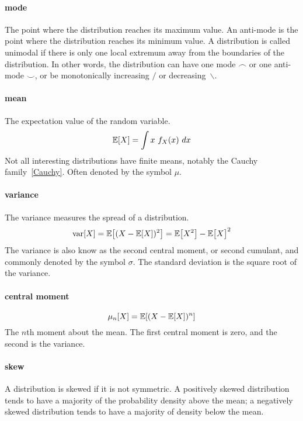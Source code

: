 \paragraph*{mode}
The point where the distribution reaches its maximum value. An anti-mode is the point where the distribution reaches its minimum value. 
A distribution is called unimodal if there is only one local extremum away from the boundaries of the distribution. In other words, the distribution can have one mode $\frown$ or one anti-mode $\smile$, or be monotonically increasing $/$ or decreasing~$\backslash$.




\paragraph*{mean} The expectation value of the random variable. 
\[
\operatorname{\mathbb E}[X] = \int x\ f_X(x)\ dx 
\notag
\]
Not all interesting distributions have finite means, notably the Cauchy family~\eqref{Cauchy}. Often denoted by the symbol $\mu$.


\paragraph*{variance} The variance measures the spread of a distribution.
\[
\op{var}[X] =  
 \expect\Left[ (X-\expect[X])^2\Right]     = \expect\bigl[X^2\bigr] - \expect\bigl[X\bigr]^2
\notag \checked
\]
The variance is also know as the second central moment, or second cumulant, and commonly denoted by the symbol $\sigma$. The standard deviation is the square root of the variance.


\paragraph*{central moment}
\[
\mu_n[X] =  
 \expect\Left[ (X-\expect[X])^n\Right]   
\]
The $n$th moment about the mean. The first central moment is zero, and the second is the variance. 

\paragraph*{skew}   A distribution is skewed if it is not symmetric. A positively skewed distribution tends to have a majority of the probability density above the mean; a negatively skewed distribution tends to have a majority of density below the mean. 

